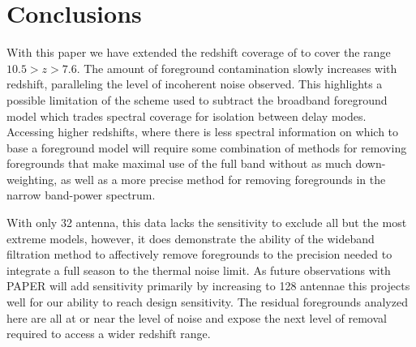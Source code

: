 \documentclass[preprint]{aastex}
\begin{document}
\section{Conclusions}
\label{sec:conclusion}



With this paper we have extended the redshift coverage of \cite{Parsons:2013p9876} to cover the range $10.5>z>7.6$.  The amount of foreground contamination slowly increases with redshift, paralleling the level of incoherent noise observed.  This highlights a possible limitation of the scheme used to subtract the broadband foreground model which trades spectral coverage for isolation between delay modes.  Accessing higher redshifts, where there is less spectral information on which to base a foreground model will require some combination of methods for removing foregrounds that make maximal use of the full band without as much down-weighting, as well as a more precise method for removing foregrounds in the narrow band-power spectrum.  



With only 32 antenna, this data lacks the sensitivity to exclude all but the most extreme models, however, it does demonstrate the ability of the wideband filtration method to affectively remove foregrounds to the precision needed to integrate a full season to the thermal noise limit.  As future observations with PAPER  will add sensitivity primarily by increasing to 128 antennae this projects well for our ability to reach design sensitivity.  The residual foregrounds analyzed here are all at or near the level of noise and expose the next level of removal required to access a wider redshift range. 









\end{document}
